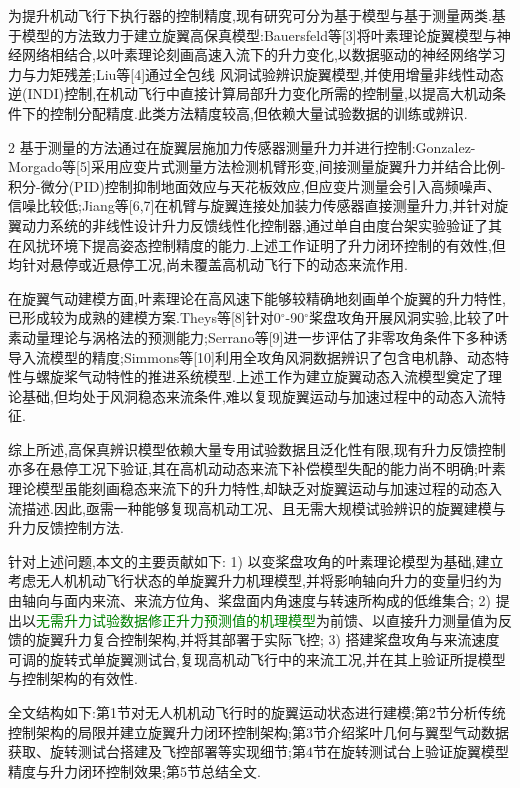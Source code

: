 \documentclass{aas}
\begin{document}
为提升机动飞行下执行器的控制精度,现有研究可分为基于模型与基于测量两类.基于模型的方法致力于建立旋翼高保真模型:Bauersfeld等[3]将叶素理论旋翼模型与神经网络相结合,以叶素理论刻画高速入流下的升力变化,以数据驱动的神经网络学习力与力矩残差;Liu等[4]通过全包线
风洞试验辨识旋翼模型,并使用增量非线性动态逆(INDI)控制,在机动飞行中直接计算局部升力变化所需的控制量,以提高大机动条件下的控制分配精度.此类方法精度较高,但依赖大量试验数据的训练或辨识.
\onecolumn\begin{multicols}{2}%
基于测量的方法通过在旋翼层施加力传感器测量升力并进行控制:Gonzalez-Morgado等[5]采用应变片式测量方法检测机臂形变,间接测量旋翼升力并结合比例-积分-微分(PID)控制抑制地面效应与天花板效应,但应变片测量会引入高频噪声、信噪比较低;Jiang等[6,7]在机臂与旋翼连接处加装力传感器直接测量升力,并针对旋翼动力系统的非线性设计升力反馈线性化控制器,通过单自由度台架实验验证了其在风扰环境下提高姿态控制精度的能力.上述工作证明了升力闭环控制的有效性,但均针对悬停或近悬停工况,尚未覆盖高机动飞行下的动态来流作用.

在旋翼气动建模方面,叶素理论在高风速下能够较精确地刻画单个旋翼的升力特性,已形成较为成熟的建模方案.Theys等[8]针对0$^{\circ}$-90$^{\circ}$桨盘攻角开展风洞实验,比较了叶素动量理论与涡格法的预测能力;Serrano等[9]进一步评估了非零攻角条件下多种诱导入流模型的精度;Simmons等[10]利用全攻角风洞数据辨识了包含电机静、动态特性与螺旋桨气动特性的推进系统模型.上述工作为建立旋翼动态入流模型奠定了理论基础,但均处于风洞稳态来流条件,难以复现旋翼运动与加速过程中的动态入流特征.

综上所述,高保真辨识模型依赖大量专用试验数据且泛化性有限,现有升力反馈控制亦多在悬停工况下验证,其在高机动动态来流下补偿模型失配的能力尚不明确;叶素理论模型虽能刻画稳态来流下的升力特性,却缺乏对旋翼运动与加速过程的动态入流描述.因此,亟需一种能够复现高机动工况、且无需大规模试验辨识的旋翼建模与升力反馈控制方法.

针对上述问题,本文的主要贡献如下:
1) 以变桨盘攻角的叶素理论模型为基础,建立考虑无人机机动飞行状态的单旋翼升力机理模型,并将影响轴向升力的变量归约为由轴向与面内来流、来流方位角、桨盘面内角速度与转速所构成的低维集合;
2) 提出以\textcolor{green}{无需升力试验数据修正升力预测值的机理模型}为前馈、以直接升力测量值为反馈的旋翼升力复合控制架构,并将其部署于实际飞控;
3) 搭建桨盘攻角与来流速度可调的旋转式单旋翼测试台,复现高机动飞行中的来流工况,并在其上验证所提模型与控制架构的有效性.

全文结构如下:第1节对无人机机动飞行时的旋翼运动状态进行建模;第2节分析传统控制架构的局限并建立旋翼升力闭环控制架构;第3节介绍桨叶几何与翼型气动数据获取、旋转测试台搭建及飞控部署等实现细节;第4节在旋转测试台上验证旋翼模型精度与升力闭环控制效果;第5节总结全文.

\end{multicols}
\end{document}
